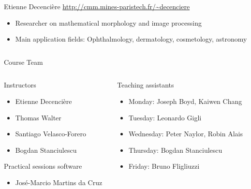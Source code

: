 \documentclass[xcolor=pdftex,dvipsnames,table,mathserif]{beamer}
\begin{document}
{\begin{columns}
\begin{column}{.8\textwidth}
    \begin{block}{Etienne Decencière \hfill \scriptsize{\url{http://cmm.mines-paristech.fr/\~decenciere}}}
      \scriptsize{
    \begin{itemize}
    \item Researcher on mathematical morphology and image processing
    \item Main application fields: Ophthalmology, dermatology, cosmetology, astronomy
    \end{itemize}
    }
  \end{block}

  \end{column}
\end{columns}



}

\begin{frame}{Course Team}

  {\scriptsize

\begin{columns}
  \begin{column}{.45\textwidth}

    \begin{block}{Instructors}
      \begin{itemize}
      \item Etienne Decencière
      \item Thomas Walter
      \item Santiago Velasco-Forero
      \item Bogdan Stanciulescu
      \end{itemize}
    \end{block}

    \begin{block}{Practical sessions software}
      \begin{itemize}
      \item José-Marcio Martins da Cruz
      \end{itemize}
    \end{block}

  \end{column}

  \begin{column}{.55\textwidth}
    \begin{block}{Teaching assistants}
      \begin{itemize}
        \item Monday: Joseph Boyd, Kaiwen Chang
      \item Tuesday: Leonardo Gigli
      \item Wednesday: Peter Naylor, Robin Alais
      \item Thursday: Bogdan Stanciulescu
      \item Friday: Bruno Fligliuzzi
      \end{itemize}
    \end{block}

  \end{column}
\end{columns}


    }

\end{frame}
\end{document}
